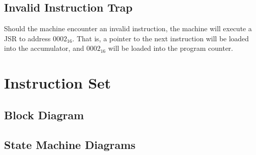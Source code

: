 \documentclass[11pt]{article}
\begin{document}
    \subsection{Invalid Instruction Trap}\label{subsec:invalid-instruction-trap}
    \par Should the machine encounter an invalid instruction, the machine will execute a JSR to address $0002_{16}$.
    That is, a pointer to the next instruction will be loaded into the accumulator, and $0002_{16}$ will be loaded
    into the program counter.
    \pagebreak

    \section{Instruction Set}\label{sec:instruction-set}
    

    \subsection{Block Diagram}\label{subsec:block-diagram}
    \subsection{State Machine Diagrams}\label{subsec:state-machine-diagrams}
\end{document}
